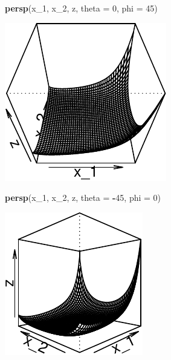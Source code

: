 \documentclass[11pt,]{article}
\newenvironment{Shaded}{\begin{snugshade}}{\end{snugshade}}
\newcommand{\KeywordTok}[1]{\textcolor[rgb]{0.13,0.29,0.53}{\textbf{#1}}}
\newcommand{\DataTypeTok}[1]{\textcolor[rgb]{0.13,0.29,0.53}{#1}}
\newcommand{\DecValTok}[1]{\textcolor[rgb]{0.00,0.00,0.81}{#1}}
\newcommand{\OperatorTok}[1]{\textcolor[rgb]{0.81,0.36,0.00}{\textbf{#1}}}
\newcommand{\NormalTok}[1]{#1}
\begin{document}
\begin{Shaded}
\begin{Highlighting}[]
\KeywordTok{persp}\NormalTok{(x_}\DecValTok{1}\NormalTok{, x_}\DecValTok{2}\NormalTok{, z, }\DataTypeTok{theta =} \DecValTok{0}\NormalTok{, }\DataTypeTok{phi =} \DecValTok{45}\NormalTok{)}
\end{Highlighting}
\end{Shaded}

\begin{center}\includegraphics{Optimization_files/figure-latex/opt_unconstr_optim_2-2} \end{center}

\begin{Shaded}
\begin{Highlighting}[]
\KeywordTok{persp}\NormalTok{(x_}\DecValTok{1}\NormalTok{, x_}\DecValTok{2}\NormalTok{, z, }\DataTypeTok{theta =} \OperatorTok{-}\DecValTok{45}\NormalTok{, }\DataTypeTok{phi =} \DecValTok{0}\NormalTok{)}
\end{Highlighting}
\end{Shaded}

\begin{center}\includegraphics{Optimization_files/figure-latex/opt_unconstr_optim_2-3} \end{center}
\end{document}
